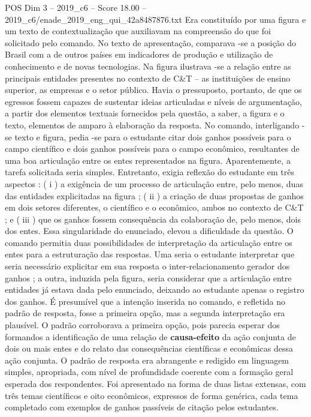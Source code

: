 \begin{textsample}{POS Dim 3 – 2019\_c6 – Score 18.00 – 2019\_c6/enade\_2019\_eng\_qui\_42a8487876.txt}
Era constituído por uma figura e um texto de contextualização que auxiliavam na compreensão do que foi solicitado pelo comando.
No texto de apresentação, comparava -se a posição do Brasil com a de outros países em indicadores de produção e utilização de conhecimento e de novas tecnologias.
Na figura ilustrava -se a relação entre as principais entidades presentes no contexto de C\&T – as instituições de ensino superior, as empresas e o setor público.
Havia o pressuposto, portanto, de que os egressos fossem capazes de sustentar ideias articuladas e níveis de argumentação, a partir dos elementos textuais fornecidos pela questão, a saber, a figura e o texto, elementos de amparo à elaboração da resposta.
No comando, interligando -se texto e figura, pedia -se para o estudante citar dois ganhos possíveis para o campo científico e dois ganhos possíveis para o campo econômico, resultantes de uma boa articulação entre os entes representados na figura.
Aparentemente, a tarefa solicitada seria simples.
Entretanto, exigia reflexão do estudante em três aspectos : ( i ) a exigência de um processo de articulação entre, pelo menos, duas das entidades explicitadas na figura ; ( ii ) a criação de duas propostas de ganhos em dois setores diferentes, o científico e o econômico, ambos no contexto de C\&T ; e ( iii ) que os ganhos fossem consequência da colaboração de, pelo menos, dois dos entes.
Essa singularidade do enunciado, elevou a dificuldade da questão.
O comando permitia duas possibilidades de interpretação da articulação entre os entes para a estruturação das respostas.
Uma seria o estudante interpretar que seria necessário explicitar em sua resposta o inter-relacionamento gerador dos ganhos ; a outra, induzida pela figura, seria considerar que a articulação entre entidades já estava dada pelo enunciado, deixando ao estudante apenas o registro dos ganhos.
É presumível que a intenção inserida no comando, e refletida no padrão de resposta, fosse a primeira opção, mas a segunda interpretação era plausível.
O padrão corroborava a primeira opção, pois parecia esperar dos formandos a identificação de uma relação de \textbf{causa-efeito} da ação conjunta de dois ou mais entes e do relato das consequências científicas e econômicas dessa ação conjunta.
O padrão de resposta era abrangente e redigido em linguagem simples, apropriada, com nível de profundidade coerente com a formação geral esperada dos respondentes.
Foi apresentado na forma de duas listas extensas, com três temas científicos e oito econômicos, expressos de forma genérica, cada tema completado com exemplos de ganhos passíveis de citação pelos estudantes.

\end{textsample}
